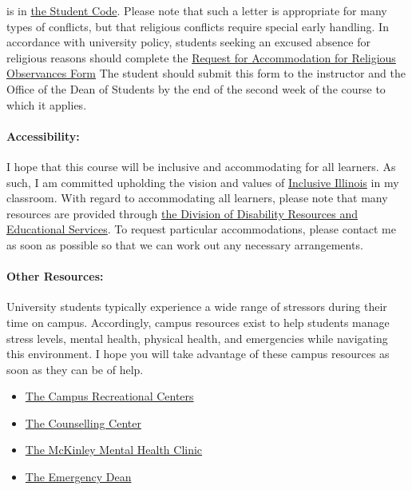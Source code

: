 \documentclass[11pt, a4paper]{article}
\begin{document}
\begin{itemize}
        is in 
        \href{http://studentcode.illinois.edu/article1_part5_1-501.html}{the 
        Student Code}. Please note that such a letter is appropriate for many 
        types of conflicts, but that religious conflicts require special early 
        handling. In accordance with university policy, students seeking an 
        excused absence for religious reasons should complete the 
	\href{http://odos.illinois.edu/community-of-care/resources/students/religious-observances/}{Request for Accommodation for Religious Observances Form} 
        The student should submit this
        form to the instructor and the Office of the Dean of Students by the end of the
        second week of the course to which it applies. 

\end{itemize}

\paragraph{Accessibility:} I hope that this course will be inclusive and 
accommodating for all learners. As such, I am committed upholding the vision 
and values of \href{http://www.inclusiveillinois.illinois.edu/index.html}{Inclusive Illinois}
in my 
classroom.  With regard to accommodating all learners, please note that many 
resources are provided through 
\href{http://disability.illinois.edu/academic-support/accommodations}{the 
Division of Disability Resources and Educational Services}.  To request 
particular accommodations, please contact me as soon as possible so that we can 
work out any necessary arrangements.

\paragraph{Other Resources:} 
University students typically experience a wide range of stressors during their 
time on campus. Accordingly, campus resources exist to help students manage  
stress levels, mental health, physical health, and emergencies while navigating 
this environment. I hope you will take advantage of these campus resources as 
soon as they can be of help.

\begin{itemize}
\item \href{https://campusrec.illinois.edu/}{The Campus Recreational Centers}
\item \href{http://counselingcenter.illinois.edu/}{The Counselling Center}
\item \href{http://www.mckinley.illinois.edu/clinics/mental\_health.htm}{The McKinley Mental Health Clinic}
\item \href{http://odos.illinois.edu/emergency/}{The Emergency Dean}
\end{itemize}
\end{document}
